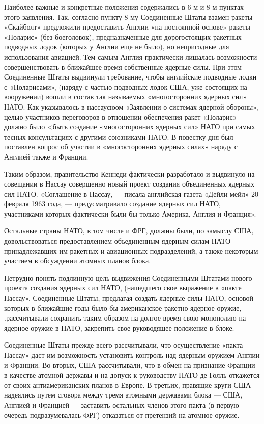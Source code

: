 \documentclass[12pt, a4paper, openany]{book}
\begin{document}
	Наиболее важные и конкретные положения содержались в 6-м и 8-м пунктах этого заявления. Так, согласно пункту 8-му Соединенные Штаты взамен ракеты «Скайболт» предложили предоставить Англии «на постоянной основе» ракеты «Поларис» (без боеголовок), предназначенные для дорогостоящих ракетных подводных лодок (которых у Англии еще не было), но непригодные для использования авиацией. Тем самым Англия практически лишалась возможности совершенствовать в ближайшее время собственные ядерные силы. При этом Соединенные Штаты выдвинули требование, чтобы английские подводные лодки с «Поларисами», (наряду с частью подводных лодок США, уже состоящих на вооружении) вошли в состав так называемых «многосторонних ядерных сил» НАТО. Как указывалось в нассаусюом «Заявлении о системах ядерной обороны», целью участников переговоров в отношении обеспечения ракет «Поларис» должно было <быть создание «многосторонних ядерных сил» НАТО при самых тесных консультациях с другими союзниками НАТО. В повестку дня был поставлен вопрос об участии в «многосторонних ядерных силах» наряду с Англией также и Франции.
	
	Таким образом, правительство Кеннеди фактически разработало и выдвинуло на совещании в Нассау совершенно новый проект создания объединенных ядерных сил НАТО. «Соглашение в Нассау, — писала английская газета «Дейли мейл» 20 февраля 1963 года, — предусматривало создание ядерных сил НАТО, участниками которых фактически были бы только Америка, Англия и Франция».
	
	Остальные страны НАТО, в том числе и ФРГ, должны были, по замыслу США, довольствоваться предоставлением объединенным ядерным силам НАТО принадлежавших им ракетных и авиационных подразделений, а также некоторым участием в обсуждении атомных планов блока.
	
	Нетрудно понять подлинную цель выдвижения Соединенными Штатами нового проекта создания ядерных сил НАТО, (нашедшего свое выражение в «пакте Нассау». Соединенные Штаты, предлагая создать ядерные силы НАТО, основой которых в ближайшие годы было бы американское ракетно-ядерное оружие, .рассчитывали сохранить таким образом на долгое время свою монополию на ядерное оружие в НАТО, закрепить свое руководящее положение в блоке.
	
	Соединенные Штаты прежде всего рассчитывали, что осуществление «пакта Нассау» даст им возможность установить контроль над ядерным оружием Англии и Франции. Во-вторых, США рассчитывали, что в обмен на признание Франции в качестве атомной державы и на допуск к руководству НАТО де Голль откажется от своих антиамериканских планов в Европе. В-третьих, правящие круги США надеялись путем сговора между тремя атомными державами блока — США, Англией и Францией — заставить остальных членов этого пакта (в первую очередь подразумевалась ФРГ) отказаться от претензий на атомное оружие.
	
\end{document}
